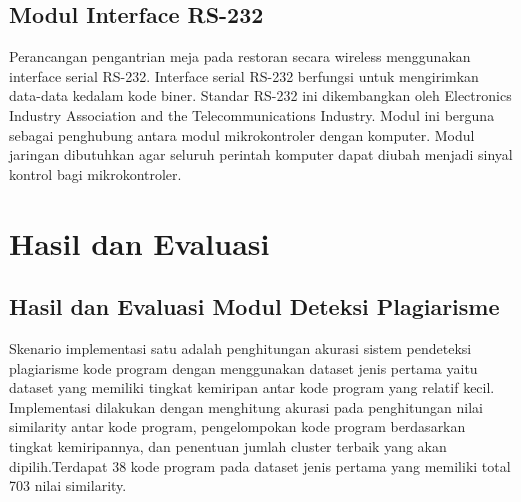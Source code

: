\documentclass[12pt,a4paper]{article}
\begin{document}
\subsection{Modul Interface RS-232}
Perancangan pengantrian meja pada restoran secara wireless  menggunakan  interface serial RS-232. Interface serial RS-232 berfungsi untuk mengirimkan data-data kedalam kode biner. Standar RS-232 ini dikembangkan oleh Electronics Industry Association and the Telecommunications Industry. Modul ini berguna sebagai penghubung antara modul mikrokontroler dengan komputer. Modul jaringan  dibutuhkan agar seluruh perintah komputer dapat diubah menjadi sinyal kontrol bagi mikrokontroler. 


\section{Hasil dan Evaluasi}
\subsection{Hasil dan Evaluasi Modul Deteksi Plagiarisme}
Skenario implementasi satu adalah penghitungan akurasi sistem pendeteksi plagiarisme kode program dengan menggunakan dataset jenis pertama yaitu dataset yang memiliki tingkat kemiripan antar kode program yang relatif kecil. Implementasi dilakukan dengan menghitung akurasi pada penghitungan nilai similarity antar kode program, pengelompokan kode program berdasarkan tingkat kemiripannya, dan penentuan jumlah cluster terbaik yang akan dipilih.Terdapat 38 kode program pada dataset jenis pertama yang memiliki total 703 nilai similarity.
\end{document}
